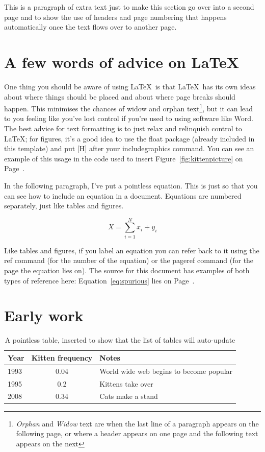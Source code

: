 This is a paragraph of extra text just to make this section go over into a
second page and to show the use of headers and page numbering that happens
automatically once the text flows over to another page.  

\section{A few words of advice on \LaTeX}

One thing you should be aware of using \LaTeX\ is that \LaTeX\ has its own
ideas about where things should be placed and about where page breaks should
happen.  This minimises the chances of widow and orphan
text\footnote{\emph{Orphan} and \emph{Widow} text are when the last line of a
paragraph appears on the following page, or where a header appears on one page
and the following text appears on the next}, but it can lead to you feeling
like you've lost control if you're used to using software like Word.  The best
advice for text formatting is to just relax and relinquish control to \LaTeX;
for figures, it's a good idea to use the float package (already included in
this template) and put [H] after your includegraphics command.  You can see an
example of this usage in the code used to insert Figure~\ref{fig:kittenpicture}
on Page~\pageref{fig:kittenpicture}.

In the following paragraph, I've put a pointless equation. This is just so that you can see how to include an equation in a document. Equations are numbered separately, just like tables and figures.

\begin{equation}
X=\sum_{i=1}^{N} x_{i}+y_{i}
\label{eq:spurious}
\end{equation}

Like tables and figures, if you label an equation you can refer back to it
using the ref command (for the number of the equation) or the pageref command
(for the page the equation lies on).  The source for this document has examples
of both types of reference here: Equation~\ref{eq:spurious} lies on
Page~\pageref{eq:spurious}.

\section{Early work}

\begin{table}[H]
\begin{tabular}{l c l}
Year & Kitten frequency & Notes \\
\hline
1993 & 0.04& World wide web begins to become popular \\
1995 & 0.2 & Kittens take over\\
2008 & 0.34 & Cats make a stand\\
\end{tabular}
\caption{A pointless table, inserted to show that the list of tables will auto-update}
\end{table}

